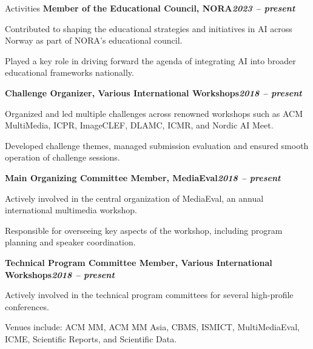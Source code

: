 \begin{rubric}{Activities}
\entry*[]%
\textbf{Member of the Educational Council, NORA\hfill\textit{2023 -- present}} \par
\begin{compactitem}
    \item Contributed to shaping the educational strategies and initiatives in AI across Norway as part of NORA's educational council.
    \item Played a key role in driving forward the agenda of integrating AI into broader educational frameworks nationally.
    \vspace{-12pt}
\end{compactitem}
% 
\entry*[]%
\textbf{Challenge Organizer, Various International Workshops\hfill\textit{2018 -- present}} \par
\begin{compactitem}
    \item Organized and led multiple challenges across renowned workshops such as ACM MultiMedia, ICPR, ImageCLEF, DLAMC, ICMR, and Nordic AI Meet. 
    \item Developed challenge themes, managed submission evaluation and ensured smooth operation of challenge sessions.
    \vspace{-12pt}
\end{compactitem}
%
\entry*[]%
\textbf{Main Organizing Committee Member, MediaEval\hfill\textit{2018 -- present}} \par
\begin{compactitem}
    \item Actively involved in the central organization of MediaEval, an annual international multimedia workshop.
    \item Responsible for overseeing key aspects of the workshop, including program planning and speaker coordination.
    \vspace{-12pt}
\end{compactitem}
% 
\entry*[]%
\textbf{Technical Program Committee Member, Various International Workshops\hfill\textit{2018 -- present}} \par
\begin{compactitem}
    \item Actively involved in the technical program committees for several high-profile conferences.
    \item Venues include: ACM MM, ACM MM Asia, CBMS, ISMICT, MultiMediaEval, ICME, Scientific Reports, and Scientific Data.
    \vspace{-12pt}

\end{compactitem}
\end{rubric}
